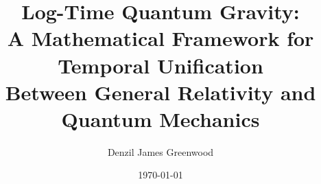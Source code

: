 \documentclass[11pt]{article}
\title{\vspace{-1em}%
Log-Time Quantum Gravity: \\
A Mathematical Framework for Temporal Unification \\
Between General Relativity and Quantum Mechanics}
\author[1]{Denzil James Greenwood}
\affil[1]{Independent Research}
\date{\today}
\theoremstyle{definition}
\theoremstyle{remark}
\begin{document}
\maketitle



\tableofcontents
\clearpage










\nocite{*}






\appendix


\end{document}
